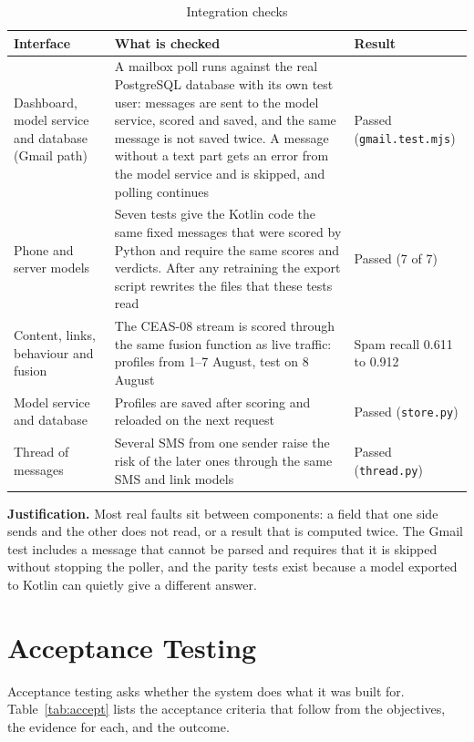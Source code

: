 {\begin{table}[H]
\caption{Integration checks}
\label{tab:integ}
\centering\small{}
\begin{tabular}{|p{3.7cm}|p{6.9cm}|p{3.6cm}|}
\hline
\textbf{Interface} & \textbf{What is checked} & \textbf{Result} \\ \hline
Dashboard, model service and database (Gmail path) & A mailbox poll runs against the real PostgreSQL database with its own test user: messages are sent to the model service, scored and saved, and the same message is not saved twice. A message without a text part gets an error from the model service and is skipped, and polling continues & Passed (\texttt{gmail.test.mjs}) \\ \hline
Phone and server models & Seven tests give the Kotlin code the same fixed messages that were scored by Python and require the same scores and verdicts. After any retraining the export script rewrites the files that these tests read & Passed (7 of 7) \\ \hline
Content, links, behaviour and fusion & The CEAS-08 stream is scored through the same fusion function as live traffic: profiles from 1--7 August, test on 8 August & Spam recall 0.611 to 0.912 \\ \hline
Model service and database & Profiles are saved after scoring and reloaded on the next request & Passed (\texttt{store.py}) \\ \hline
Thread of messages & Several SMS from one sender raise the risk of the later ones through the same SMS and link models & Passed (\texttt{thread.py}) \\ \hline
\end{tabular}
\end{table}

\textbf{Justification.} Most real faults sit between components: a field that one side sends and the other does not read, or a result that is computed twice. The Gmail test includes a message that cannot be parsed and requires that it is skipped without stopping the poller, and the parity tests exist because a model exported to Kotlin can quietly give a different answer.

\section{Acceptance Testing}\label{sec:at}
Acceptance testing asks whether the system does what it was built for. Table~\ref{tab:accept} lists the acceptance criteria that follow from the objectives, the evidence for each, and the outcome.

}
